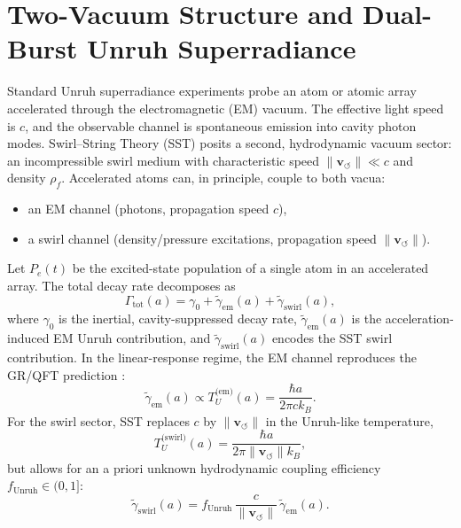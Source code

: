 \documentclass[10pt,reprint,aps,onecolumn,nofootinbib]{revtex4-2}
\begin{document}
    \section{Two-Vacuum Structure and Dual-Burst Unruh Superradiance}
    \label{sec:sst_two_vacua_unruh}

    Standard Unruh superradiance experiments probe an atom or atomic array
    accelerated through the electromagnetic (EM) vacuum. The effective light
    speed is $c$, and the observable channel is spontaneous emission into
    cavity photon modes. Swirl--String Theory (SST) posits a second, hydrodynamic
    vacuum sector: an incompressible swirl medium with characteristic speed
    $\lVert\mathbf{v}_{\!\boldsymbol{\circlearrowleft}}\rVert \ll c$ and
    density $\rho_{\!f}$. Accelerated atoms can, in principle, couple to both
    vacua:
    \begin{itemize}
        \item an EM channel (photons, propagation speed $c$),
        \item a swirl channel (density/pressure excitations, propagation speed
        $\lVert\mathbf{v}_{\!\boldsymbol{\circlearrowleft}}\rVert$).
    \end{itemize}

    Let $P_e(t)$ be the excited-state population of a single atom in an
    accelerated array. The total decay rate decomposes as
    \begin{equation}
        \Gamma_{\text{tot}}(a) =
        \gamma_0
        + \tilde\gamma_{\text{em}}(a)
        + \tilde\gamma_{\text{swirl}}(a),
        \label{eq:gamma_tot_two_vacuum}
    \end{equation}
    where $\gamma_0$ is the inertial, cavity-suppressed decay rate,
    $\tilde\gamma_{\text{em}}(a)$ is the acceleration-induced EM Unruh
    contribution, and $\tilde\gamma_{\text{swirl}}(a)$ encodes the SST swirl
    contribution. In the linear-response regime, the EM channel reproduces the
    GR/QFT prediction \cite{Unruh1976,Lochan2020,Deswal2025}:
    \begin{equation}
        \tilde\gamma_{\text{em}}(a) \propto T_U^{\text{(em)}}(a)
        = \frac{\hbar a}{2\pi c k_B}.
    \end{equation}
    For the swirl sector, SST replaces $c$ by $\lVert\mathbf{v}_{\!\boldsymbol{\circlearrowleft}}\rVert$
    in the Unruh-like temperature,
    \begin{equation}
        T_U^{\text{(swirl)}}(a) =
        \frac{\hbar a}{2\pi \lVert\mathbf{v}_{\!\boldsymbol{\circlearrowleft}}\rVert k_B},
    \end{equation}
    but allows for an a priori unknown hydrodynamic coupling efficiency
    $f_{\text{Unruh}}\in(0,1]$:
    \begin{equation}
        \tilde\gamma_{\text{swirl}}(a)
        = f_{\text{Unruh}}\,
        \frac{c}{\lVert\mathbf{v}_{\!\boldsymbol{\circlearrowleft}}\rVert}\,
        \tilde\gamma_{\text{em}}(a).
        \label{eq:gamma_swirl_def}
    \end{equation}
\end{document}
